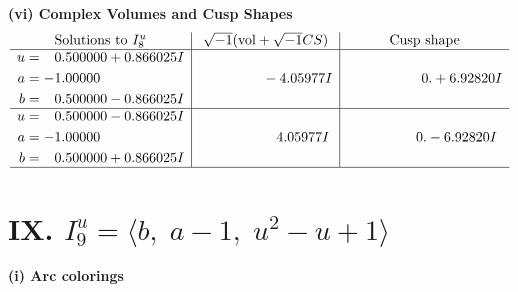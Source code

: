 \documentclass[1p]{elsarticle_modified}
\theoremstyle{definition}
\newcommand{\I}{\sqrt{-1}}
\begin{document}
\newpage\flushleft \textbf{(vi) Complex Volumes and Cusp Shapes}
$$\begin{array}{c|c|c}  
\text{Solutions to }I^u_{8}& \I (\text{vol} + \sqrt{-1}CS) & \text{Cusp shape}\\
 \hline 
\begin{aligned}
u &= \phantom{-}0.500000 + 0.866025 I \\
a &= -1.00000\phantom{ +0.000000I} \\
b &= \phantom{-}0.500000 - 0.866025 I\end{aligned}
 & \phantom{-0.000000 } -4.05977 I & \phantom{-0.000000 -}0. + 6.92820 I \\ \hline\begin{aligned}
u &= \phantom{-}0.500000 - 0.866025 I \\
a &= -1.00000\phantom{ +0.000000I} \\
b &= \phantom{-}0.500000 + 0.866025 I\end{aligned}
 & \phantom{-0.000000 -}4.05977 I & \phantom{-0.000000 } 0. - 6.92820 I\\
 \hline 
 \end{array}$$\newpage\newpage\renewcommand{\arraystretch}{1}
\centering \section*{IX. $I^u_{9}= \langle b,\;a-1,\;u^2- u+1 \rangle$}
\flushleft \textbf{(i) Arc colorings}\\
\end{document}
